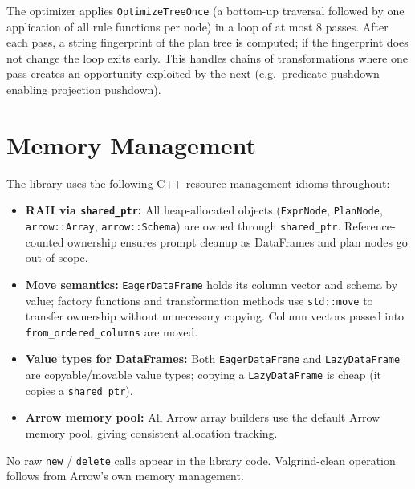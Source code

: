 \documentclass[12pt,a4paper]{article}
\begin{document}
The optimizer applies \texttt{OptimizeTreeOnce} (a bottom-up traversal
followed by one application of all rule functions per node) in a loop of
at most 8 passes.  After each pass, a string fingerprint of the plan tree
is computed; if the fingerprint does not change the loop exits early.  This
handles chains of transformations where one pass creates an opportunity
exploited by the next (e.g.\ predicate pushdown enabling projection
pushdown).

\section{Memory Management}

The library uses the following C++ resource-management idioms throughout:

\begin{itemize}[leftmargin=1.5em]
  \item \textbf{RAII via \texttt{shared\_ptr}:}  All heap-allocated
        objects (\texttt{ExprNode}, \texttt{PlanNode},
        \texttt{arrow::Array}, \texttt{arrow::Schema}) are owned through
        \texttt{shared\_ptr}.  Reference-counted ownership ensures prompt
        cleanup as DataFrames and plan nodes go out of scope.

  \item \textbf{Move semantics:}  \texttt{EagerDataFrame} holds its column
        vector and schema by value; factory functions and transformation
        methods use \texttt{std::move} to transfer ownership without
        unnecessary copying.  Column vectors passed into
        \texttt{from\_ordered\_columns} are moved.

  \item \textbf{Value types for DataFrames:}  Both \texttt{EagerDataFrame}
        and \texttt{LazyDataFrame} are copyable/movable value types;
        copying a \texttt{LazyDataFrame} is cheap (it copies a
        \texttt{shared\_ptr}).

  \item \textbf{Arrow memory pool:}  All Arrow array builders use the
        default Arrow memory pool, giving consistent allocation tracking.
\end{itemize}

No raw \texttt{new} / \texttt{delete} calls appear in the library code.
Valgrind-clean operation follows from Arrow's own memory management.
\end{document}
